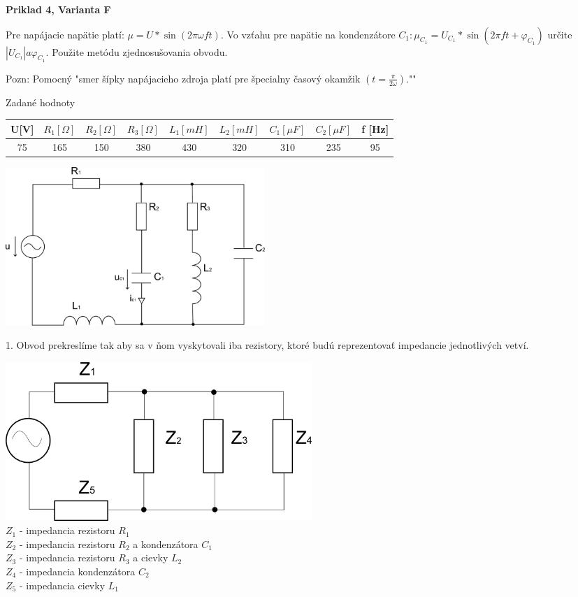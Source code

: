\documentclass[a4paper,12pt]{article}
\begin{document}
\newpage
\begin{center}
\textbf{Priklad 4, Varianta F}
\end{center}
\bigskip
Pre napájacie napätie platí: $\mu = U * \sin (2\pi\omega ft)$. Vo vzťahu pre napätie na kondenzátore $C_1: \mu_{C_1} = U_{C_1} * \sin (2\pi ft + \varphi_{C_1})$ určite $|U_{C_1}| a \varphi_{C_1}$.
Použite metódu zjednosušovania obvodu.

Pozn: Pomocný "smer šípky napájacieho zdroja platí pre špecialny časový okamžik $(t = \frac{\pi}{2\omega})$.""
\bigskip

Zadané hodnoty

\begin{tabular} {|  c | c |  c | c | c | c | c | c | c | }
\hline
U[V] &  $R_1 [\Omega]$  & $R_2 [\Omega]$  &$R_3 [\Omega]$  & $L_1 [mH]$ & $L_2 [mH]$ & $C_1[\mu F]$ & $C_2[\mu F]$  & f [Hz] \\ \hline
75 & 165 & 150 & 380 & 430 & 320 & 310 & 235 & 95\\ \hline
\end{tabular}
\bigskip

\includegraphics[height=6cm]{img/pr4a}

1. Obvod prekreslíme tak aby sa v ňom vyskytovali iba rezistory, ktoré budú reprezentovať impedancie jednotlivých vetví.

\includegraphics[height=6cm]{img/pr4b} \\
	$Z_1$ - impedancia rezistoru $R_1$  \\
	$Z_2$ - impedancia rezistoru $R_2$ a kondenzátora $C_1$ \\
	$Z_3$ - impedancia rezistoru $R_3$ a cievky $L_2$  \\
	$Z_4$ - impedancia kondenzátora $C_2$  \\
	$Z_5$ - impedancia cievky $L_1$  \\
\end{document}

